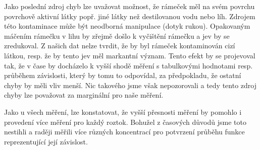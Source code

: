 \documentclass[a4paper]{article}
\begin{document}
\par Jako poslední zdroj chyb lze uvažovat možnost, že rámeček měl na svém povrchu povrchově aktivní látky popř. jiné látky než destilovanou vodu nebo líh. Zdrojem této kontaminace může být neodborná manipulace (dotyk rukou). Opakovaným máčením rámečku v lihu by zřejmě došlo k vyčištění rámečku a jev by se zredukoval. Z našich dat nelze tvrdit, že by byl rámeček kontaminován cizí látkou, resp. že by tento jev měl markantní význam. Tento efekt by se projevoval tak, že v čase by docházelo k vyšší shodě měření s tabulkovými hodnotami resp. průběhem závislosti, který by tomu to odpovídal, za předpokladu, že ostatní chyby by měli vliv menší. Nic takového jsme však nepozorovali a tedy tento zdroj chyby lze považovat za marginální pro naše měření.
\par Jako u všech měření, lze konstatovat, že vyšší přesnosti měření by pomohlo i provedení více měření pro každý roztok. Bohužel z časových důvodů jsme toto nestihli a raději měřili více různých koncentrací pro potvrzení průběhu funkce reprezentující její závislost.
\end{document}
